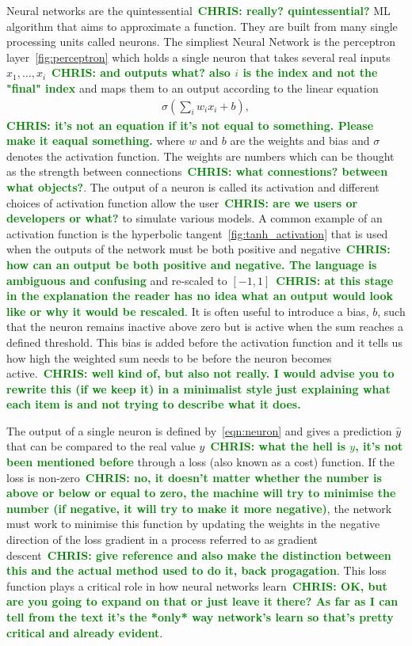 \documentclass[12pt]{iopart}
\newcommand{\chris}[1]{\textbf{\textcolor{green}{CHRIS: #1}}}
\begin{document}
%
Neural networks are the quintessential~\chris{really? quintessential?} \ac{ML}
algorithm that aims to approximate a function. They are built from many single
processing units called neurons. The simpliest Neural Network is the perceptron
layer~\cref{fig:perceptron} which holds a single neuron that takes several real
inputs $x_{1},\ldots, x_{i}$~\chris{and outputs what? also $i$ is the index and not the "final" index}
and maps them to an output according to the linear equation 
%
\begin{align}
\sigma(\sum_i w_i x_i + b),
\label{eqn:neuron}
\end{align}
%
\chris{it's not an equation if it's not equal to something. Please make it
eaqual something.} where $w$ and $b$ are the weights and bias and $\sigma$
denotes the activation function. The weights are numbers which can be thought
as the strength between connections~\chris{what connestions? between what
objects?}. The output of a neuron is called its activation and different
choices of activation function allow the user~\chris{are we users or developers
or what?} to simulate various models. A common example of an activation
function is the hyperbolic tangent~\cref{fig:tanh_activation} that is used when
the outputs of the network must be both positive and negative~\chris{how can an
output be both positive and negative. The language is ambiguous and confusing}
and re-scaled to $[-1,1]$~\chris{at this stage in the explanation the reader
has no idea what an output would look like or why it would be rescaled}. It is
often useful to introduce a bias, $b$, such that the neuron remains inactive
above zero but is active when the sum reaches a defined threshold. This bias is
added before the activation function and it tells us how high the weighted sum
needs to be before the neuron becomes active.~\chris{well kind of, but also not
really. I would advise you to rewrite this (if we keep it) in a minimalist
style just explaining what each item is and not trying to describe what it
does.}

%
The output of a single neuron is defined by~\cref{eqn:neuron} and gives a
prediction $\hat{y}$ that can be compared to the real value $y$~\chris{what the
hell is $y$, it's not been mentioned before} through a loss (also known as a
cost) function. If the loss is non-zero~\chris{no, it doesn't matter whether
the number is above or below or equal to zero, the machine will try to minimise
the number (if negative, it will try to make it more negative)}, the network
must work to minimise this function by updating the weights in the negative
direction of the loss gradient in a process referred to as gradient
descent~\chris{give reference and also make the distinction between this and
the actual method used to do it, back progagation}. This loss function plays a
critical role in how neural networks learn~\chris{OK, but are you going to
expand on that or just leave it there? As far as I can tell from the text it's
the *only* way network's learn so that's pretty critical and already evident}.
\end{document}
